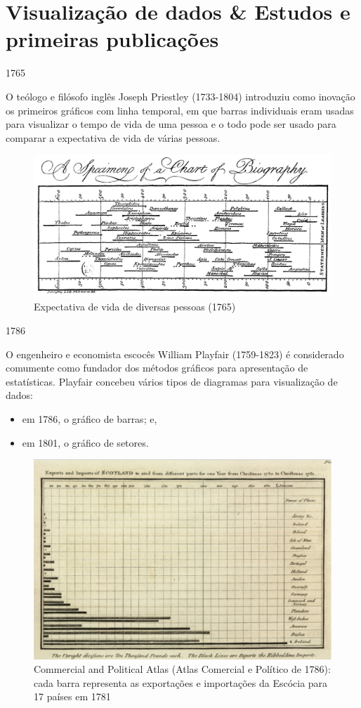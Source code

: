 \documentclass[
]{book}
\providecommand{\tightlist}{%
  \setlength{\itemsep}{0pt}\setlength{\parskip}{0pt}}
\theoremstyle{definition}
\theoremstyle{definition}
\theoremstyle{definition}
\theoremstyle{definition}
\theoremstyle{remark}
\begin{document}
\hypertarget{visualizauxe7uxe3o-de-dados-estudos-e-primeiras-publicauxe7uxf5es}{%
\section{Visualização de dados \& Estudos e primeiras publicações}\label{visualizauxe7uxe3o-de-dados-estudos-e-primeiras-publicauxe7uxf5es}}

1765

O teólogo e filósofo inglês Joseph Priestley (1733-1804) introduziu como inovação os primeiros gráficos com linha temporal, em que barras individuais eram usadas para visualizar o tempo de vida de uma pessoa e o todo pode ser usado para comparar a expectativa de vida de várias pessoas.

\begin{figure}

{\centering \includegraphics[width=0.5\linewidth]{images/priestley-timechart-1765} 

}

\caption{Expectativa de vida de diversas pessoas (1765)}\label{fig:unnamed-chunk-10}
\end{figure}

1786

O engenheiro e economista escocês William Playfair (1759-1823) é considerado comumente como fundador dos métodos gráficos para apresentação de estatísticas. Playfair concebeu vários tipos de diagramas para visualização de dados:

\begin{itemize}
\tightlist
\item
  em 1786, o gráfico de barras; e,
\item
  em 1801, o gráfico de setores.
\end{itemize}

\begin{figure}

{\centering \includegraphics[width=0.5\linewidth]{images/playfair-barchart-1786} 

}

\caption{Commercial and Political Atlas (Atlas Comercial e Político de 1786): cada barra representa as exportações e importações da Escócia para 17 países em 1781}\label{fig:unnamed-chunk-11}
\end{figure}
\end{document}
